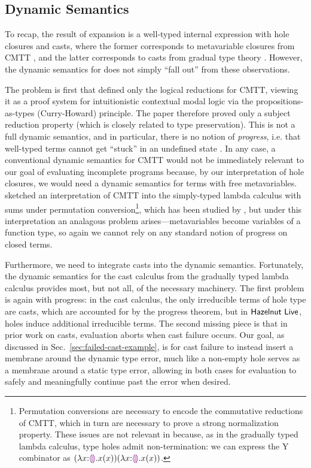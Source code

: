 \subsection{Dynamic Semantics}
\label{sec:evaluation}

To recap, the result of expansion is a well-typed internal expression with hole closures and casts, where the former corresponds to metavariable closures from CMTT \cite{Nanevski2008}, and the latter corresponds to casts from gradual type theory \cite{Siek06a,DBLP:conf/snapl/SiekVCB15}. However, the dynamic semantics for \HazelnutLive does not simply ``fall out'' from these observations. 

The problem is first that \citet{Nanevski2008} defined only the logical reductions for CMTT, viewing it as a proof system for intuitionistic contextual modal logic via the propositions-as-types (Curry-Howard) principle. The paper therefore proved only a subject reduction property (which is closely related to type preservation). This is not a full dynamic semantics, and in particular, there is no notion of \emph{progress}, i.e. that well-typed terms cannot get ``stuck'' in an undefined state \cite{wright94:_type_soundness}. In any case, a conventional dynamic semantics for CMTT would not be immediately relevant to our goal of evaluating incomplete programs because, by our interpretation of hole closures, we would need a dynamic semantics for terms with free metavariables. \citet{Nanevski2008} sketched an interpretation of CMTT into the simply-typed lambda calculus with sums under permutation conversion\footnote{Permutation conversions are necessary to encode the commutative reductions of CMTT, which in turn are necessary to prove a strong normalization property. These issues are not relevant in \HazelnutLive because, as in the gradually typed lambda calculus, type holes admit non-termination: we can express the Y combinator as $(\lambda x{:}\textcolor{violet}{\llparenthesis}\textcolor{violet}{\rrparenthesis}.x(x)) (\lambda x{:}\textcolor{violet}{\llparenthesis}\textcolor{violet}{\rrparenthesis}.x(x))$.}, which has been studied by \citet{DBLP:journals/iandc/Groote02}, but under this interpretation an analagous problem arises---metavariables become variables of a function type, so again we cannot rely on any standard notion of progress on closed terms.%

Furthermore, we need to integrate casts into the dynamic semantics. Fortunately, the dynamic semantics for the cast calculus from the gradually typed lambda calculus provides most, but not all, of the necessary machinery. The first problem is again with progress: in the cast calculus, the only irreducible terms of hole type are casts, which are accounted for by the progress theorem, but in $\textsf{Hazelnut Live}$, holes induce additional irreducible terms. The second missing piece is that in prior work on casts, evaluation aborts when cast failure occurs. Our goal, as discussed in Sec.~\ref{sec:failed-cast-example}, is for cast failure to instead insert a membrane around the dynamic type error, much like a non-empty hole serves as a membrane around a static type error, allowing in both cases for evaluation to safely and meaningfully continue past the error when desired.

